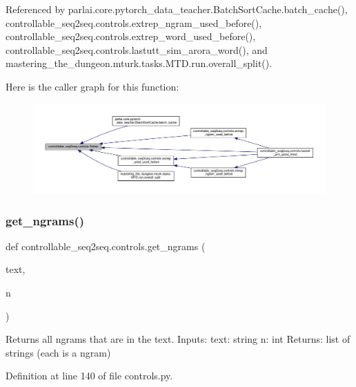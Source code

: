 Referenced by parlai.\+core.\+pytorch\+\_\+data\+\_\+teacher.\+Batch\+Sort\+Cache.\+batch\+\_\+cache(), controllable\+\_\+seq2seq.\+controls.\+extrep\+\_\+ngram\+\_\+used\+\_\+before(), controllable\+\_\+seq2seq.\+controls.\+extrep\+\_\+word\+\_\+used\+\_\+before(), controllable\+\_\+seq2seq.\+controls.\+lastutt\+\_\+sim\+\_\+arora\+\_\+word(), and mastering\+\_\+the\+\_\+dungeon.\+mturk.\+tasks.\+M\+T\+D.\+run.\+overall\+\_\+split().

Here is the caller graph for this function\+:
\nopagebreak
\begin{figure}[H]
\begin{center}
\leavevmode
\includegraphics[width=350pt]{namespacecontrollable__seq2seq_1_1controls_a7c34984d4b5df8732e5e8176bf1663e3_icgraph}
\end{center}
\end{figure}
\mbox{\label{namespacecontrollable__seq2seq_1_1controls_a3fad33534b785e9e43e2145199347e05}} 
\subsubsection{\texorpdfstring{get\+\_\+ngrams()}{get\_ngrams()}}
{\footnotesize\ttfamily def controllable\+\_\+seq2seq.\+controls.\+get\+\_\+ngrams (\begin{DoxyParamCaption}\item[{}]{text,  }\item[{}]{n }\end{DoxyParamCaption})}

\begin{DoxyVerb}Returns all ngrams that are in the text.
Inputs:
    text: string
    n: int
Returns:
    list of strings (each is a ngram)
\end{DoxyVerb}
 

Definition at line 140 of file controls.\+py.



